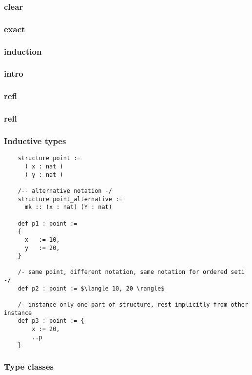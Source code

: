 \documentclass[a4paper,10pt,oneside]{report}%
\begin{document}
    \subsubsection{clear}
    \subsubsection{exact}
    \subsubsection{induction}
    \subsubsection{intro}
    \subsubsection{refl}
    \subsubsection{refl}
\subsubsection{Inductive types}

\begin{verbatim}
    structure point :=
      ( x : nat )
      ( y : nat )

    /-- alternative notation -/
    structure point_alternative :=
      mk :: (x : nat) (Y : nat)

    def p1 : point :=
    {
      x   := 10,
      y   := 20,
    }

    /- same point, different notation, same notation for ordered seti -/
    def p2 : point := $\langle 10, 20 \rangle$

    /- instance only one part of structure, rest implicitly from other instance
    def p3 : point := {
        x := 20,
        ..p
    }
\end{verbatim}

\subsubsection{Type classes}
\end{document}
